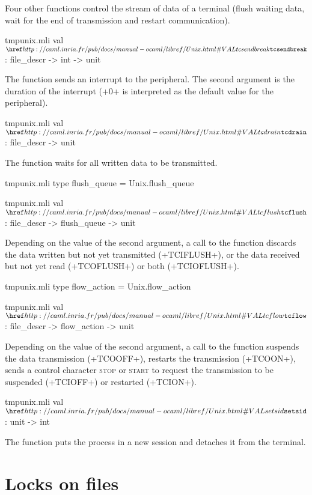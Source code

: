 Four other functions control the stream of data of a terminal
(flush waiting data, wait for the end of transmission and restart
communication).
%
\begin{listingcodefile}{tmpunix.mli}
val $\libvalue{Unix}{tcsendbreak}$ : file_descr -> int -> unit
\end{listingcodefile}
%
The function  sends an interrupt to the 
peripheral. The second argument is the duration of the interrupt
(\ml+0+ is interpreted as the default value for the 
peripheral).
%
\begin{listingcodefile}{tmpunix.mli}
val $\libvalue{Unix}{tcdrain}$ : file_descr -> unit
\end{listingcodefile}
%
The function  waits for all written data to
be transmitted.
%
\begin{codefile}{tmpunix.mli}
type flush_queue = Unix.flush_queue
\end{codefile}
%
\begin{listingcodefile}{tmpunix.mli}
val $\libvalue{Unix}{tcflush}$ : file_descr -> flush_queue -> unit
\end{listingcodefile}
% 
Depending on the value of the second argument, a call to the
function  discards the data written but not yet
transmitted (\ml+TCIFLUSH+), or the data received but not yet read
(\ml+TCOFLUSH+) or both (\ml+TCIOFLUSH+).
%
\begin{codefile}{tmpunix.mli}
type flow_action = Unix.flow_action
\end{codefile}
%
\begin{listingcodefile}{tmpunix.mli}
val $\libvalue{Unix}{tcflow}$ : file_descr -> flow_action -> unit
\end{listingcodefile}
% 
Depending on the value of the second argument, a call to the
function  suspends the data transmission
(\ml+TCOOFF+), restarts the transmission (\ml+TCOON+), sends a control
character \textsc{stop} or \textsc{start} to request the
transmission to be suspended (\ml+TCIOFF+) or restarted (\ml+TCION+).
%
\begin{listingcodefile}{tmpunix.mli}
val $\libvalue{Unix}{setsid}$ : unit -> int
\end{listingcodefile}
%
The function  puts the process in a new
session and detaches it from the terminal.

\section{Locks on files}

